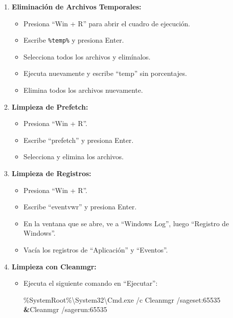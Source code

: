 \documentclass[
  jou,
  floatsintext,
  longtable,
  a4paper,
  nolmodern,
  notxfonts,
  notimes,
  12pt,
  colorlinks=true,linkcolor=blue,citecolor=blue,urlcolor=blue]{apa7}
\newenvironment{Shaded}{\begin{snugshade}}{\end{snugshade}}
\newcommand{\ExtensionTok}[1]{\textcolor[rgb]{0.00,0.23,0.31}{#1}}
\newcommand{\KeywordTok}[1]{\textcolor[rgb]{0.00,0.23,0.31}{\textbf{#1}}}
\newcommand{\NormalTok}[1]{\textcolor[rgb]{0.00,0.23,0.31}{#1}}
\providecommand{\tightlist}{%
  \setlength{\itemsep}{0pt}\setlength{\parskip}{0pt}}
\begin{document}
\begin{enumerate}
\def\labelenumi{\arabic{enumi}.}
\item
  \textbf{Eliminación de Archivos Temporales:}

  \begin{itemize}
  \tightlist
  \item
    Presiona ``Win + R'' para abrir el cuadro de ejecución.
  \item
    Escribe \texttt{\%temp\%} y presiona Enter.
  \item
    Selecciona todos los archivos y elimínalos.
  \item
    Ejecuta nuevamente y escribe ``temp'' sin porcentajes.
  \item
    Elimina todos los archivos nuevamente.
  \end{itemize}
\item
  \textbf{Limpieza de Prefetch:}

  \begin{itemize}
  \tightlist
  \item
    Presiona ``Win + R''.
  \item
    Escribe ``prefetch'' y presiona Enter.
  \item
    Selecciona y elimina los archivos.
  \end{itemize}
\item
  \textbf{Limpieza de Registros:}

  \begin{itemize}
  \tightlist
  \item
    Presiona ``Win + R''.
  \item
    Escribe ``eventvwr'' y presiona Enter.
  \item
    En la ventana que se abre, ve a ``Windows Log'', luego ``Registro de
    Windows''.
  \item
    Vacía los registros de ``Aplicación'' y ``Eventos''.
  \end{itemize}
\item
  \textbf{Limpieza con Cleanmgr:}

  \begin{itemize}
  \item
    Ejecuta el siguiente comando en ``Ejecutar'':

\begin{Shaded}
\begin{Highlighting}[]
\ExtensionTok{\%SystemRoot\%\textbackslash{}System32\textbackslash{}Cmd.exe}\NormalTok{ /c Cleanmgr /sageset:65535 }\KeywordTok{\&}\ExtensionTok{Cleanmgr}\NormalTok{ /sagerun:65535}
\end{Highlighting}
\end{Shaded}
  \end{itemize}
\end{enumerate}
\end{document}
